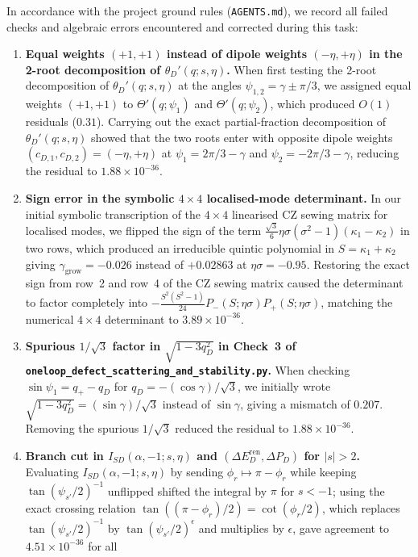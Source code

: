 \documentclass[11pt,a4paper]{article}
\begin{document}
In accordance with the project ground rules (\texttt{AGENTS.md}), we record all
failed checks and algebraic errors encountered and corrected during this task:
\begin{enumerate}
\item \textbf{Equal weights $(+1,+1)$ instead of dipole weights $(-\eta,+\eta)$ in the 2-root decomposition of $\theta_D'(q;s,\eta)$.}
When first testing the 2-root decomposition of $\theta_D'(q;s,\eta)$ at the
angles $\psi_{1,2} = \gamma \pm \pi/3$, we assigned equal weights $(+1,+1)$ to
$\Theta'(q;\psi_1)$ and $\Theta'(q;\psi_2)$, which produced $O(1)$ residuals
($0.31$). Carrying out the exact partial-fraction decomposition of
$\theta_D'(q;s,\eta)$ showed that the two roots enter with opposite dipole weights
$(c_{D,1},c_{D,2}) = (-\eta,+\eta)$ at $\psi_1 = 2\pi/3-\gamma$ and
$\psi_2 = -2\pi/3-\gamma$, reducing the residual to $1.88\times 10^{-36}$.
\item \textbf{Sign error in the symbolic $4\times 4$ localised-mode determinant.}
In our initial symbolic transcription of the $4\times 4$ linearised CZ sewing
matrix for localised modes, we flipped the sign of the term
$\frac{\sqrt{3}}{6}\eta\sigma(\sigma^2-1)(\kappa_1-\kappa_2)$ in two rows,
which produced an irreducible quintic polynomial in $S = \kappa_1+\kappa_2$ giving
$\gamma_{\mathrm{grow}} = -0.026$ instead of $+0.02863$ at $\eta\sigma = -0.95$.
Restoring the exact sign from row~2 and row~4 of the CZ sewing matrix caused the
determinant to factor completely into $-\frac{S^2(S^2-1)}{24}P_-(S;\eta\sigma)P_+(S;\eta\sigma)$,
matching the numerical $4\times 4$ determinant to $3.89\times 10^{-36}$.
\item \textbf{Spurious $1/\sqrt{3}$ factor in $\sqrt{1-3q_D^2}$ in Check~3 of \texttt{oneloop\_defect\_scattering\_and\_stability.py}.}
When checking $\sin\psi_1 = q_+ - q_D$ for $q_D = -(\cos\gamma)/\sqrt{3}$, we
initially wrote $\sqrt{1-3q_D^2} = (\sin\gamma)/\sqrt{3}$ instead of $\sin\gamma$,
giving a mismatch of $0.207$. Removing the spurious $1/\sqrt{3}$ reduced the
residual to $1.88\times 10^{-36}$.
\item \textbf{Branch cut in $I_{SD}(\alpha,-1;s,\eta)$ and $(\Delta E_D^{\mathrm{ren}},\Delta P_D)$ for $|s|>2$.}
Evaluating $I_{SD}(\alpha,-1;s,\eta)$ by sending $\phi_r \mapsto \pi-\phi_r$
while keeping $\tan(\psi_{s'}/2)^{-1}$ unflipped shifted the integral by $\pi$
for $s<-1$; using the exact crossing relation $\tan((\pi-\phi_r)/2) = \cot(\phi_r/2)$,
which replaces $\tan(\psi_{s'}/2)^{-1}$ by $\tan(\psi_{s'}/2)^\epsilon$ and
multiplies by $\epsilon$, gave agreement to $4.51\times 10^{-36}$ for all

\end{enumerate}
\end{document}
